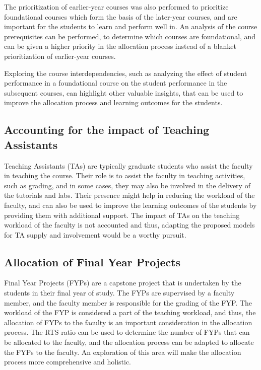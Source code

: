 The prioritization of earlier-year courses was also performed to prioritize foundational courses which form the basis of the later-year courses, and are important for the students to learn and perform well in. An analysis of the course prerequisites can be performed, to determine which courses are foundational, and can be given a higher priority in the allocation process instead of a blanket prioritization of earlier-year courses.

Exploring the course interdependencies, such as analyzing the effect of student performance in a foundational course on the student performance in the subsequent courses, can highlight other valuable insights, that can be used to improve the allocation process and learning outcomes for the students.

\subsection{Accounting for the impact of Teaching Assistants}

Teaching Assistants (TAs) are typically graduate students who assist the faculty in teaching the course. Their role is to assist the faculty in teaching activities, such as grading, and in some cases, they may also be involved in the delivery of the tutorials and labs. Their presence might help in reducing the workload of the faculty, and can also be used to improve the learning outcomes of the students by providing them with additional support. The impact of TAs on the teaching workload of the faculty is not accounted and thus, adapting the proposed models for TA supply and involvement would be a worthy pursuit.

\subsection{Allocation of Final Year Projects}

Final Year Projects (FYPs) are a capstone project that is undertaken by the students in their final year of study. The FYPs are supervised by a faculty member, and the faculty member is responsible for the grading of the FYP. The workload of the FYP is considered a part of the teaching workload, and thus, the allocation of FYPs to the faculty is an important consideration in the allocation process. The RTS ratio can be used to determine the number of FYPs that can be allocated to the faculty, and the allocation process can be adapted to allocate the FYPs to the faculty. An exploration of this area will make the allocation process more comprehensive and holistic.


